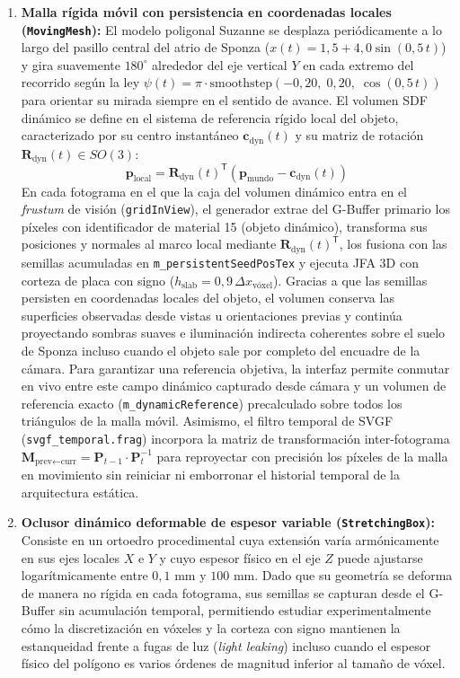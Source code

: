 \begin{enumerate}
  \item \textbf{Malla rígida móvil con persistencia en coordenadas locales (\texttt{MovingMesh}):} El modelo poligonal Suzanne se desplaza periódicamente a lo largo del pasillo central del atrio de Sponza ($x(t) = 1,5 + 4,0 \sin(0,5\,t)$) y gira suavemente $180^\circ$ alrededor del eje vertical $Y$ en cada extremo del recorrido según la ley $\psi(t) = \pi \cdot \text{smoothstep}(-0,20,\; 0,20,\; \cos(0,5\,t))$ para orientar su mirada siempre en el sentido de avance. El volumen SDF dinámico se define en el sistema de referencia rígido local del objeto, caracterizado por su centro instantáneo $\mathbf{c}_{\text{dyn}}(t)$ y su matriz de rotación $\mathbf{R}_{\text{dyn}}(t) \in SO(3)$:
  \begin{equation}
    \mathbf{p}_{\text{local}} = \mathbf{R}_{\text{dyn}}(t)^{\mathsf{T}} \left( \mathbf{p}_{\text{mundo}} - \mathbf{c}_{\text{dyn}}(t) \right)
  \end{equation}
  En cada fotograma en el que la caja del volumen dinámico entra en el \textit{frustum} de visión (\texttt{gridInView}), el generador extrae del G-Buffer primario los píxeles con identificador de material 15 (objeto dinámico), transforma sus posiciones y normales al marco local mediante $\mathbf{R}_{\text{dyn}}(t)^{\mathsf{T}}$, los fusiona con las semillas acumuladas en \texttt{m\_persistentSeedPosTex} y ejecuta JFA 3D con corteza de placa con signo ($h_{\text{slab}} = 0,9\,\Delta x_{\text{vóxel}}$). Gracias a que las semillas persisten en coordenadas locales del objeto, el volumen conserva las superficies observadas desde vistas u orientaciones previas y continúa proyectando sombras suaves e iluminación indirecta coherentes sobre el suelo de Sponza incluso cuando el objeto sale por completo del encuadre de la cámara. Para garantizar una referencia objetiva, la interfaz permite conmutar en vivo entre este campo dinámico capturado desde cámara y un volumen de referencia exacto (\texttt{m\_dynamicReference}) precalculado sobre todos los triángulos de la malla móvil. Asimismo, el filtro temporal de SVGF (\texttt{svgf\_temporal.frag}) incorpora la matriz de transformación inter-fotograma $\mathbf{M}_{\text{prev}\leftarrow\text{curr}} = \mathbf{P}_{t-1} \cdot \mathbf{P}_t^{-1}$ para reproyectar con precisión los píxeles de la malla en movimiento sin reiniciar ni emborronar el historial temporal de la arquitectura estática.
  \item \textbf{Oclusor dinámico deformable de espesor variable (\texttt{StretchingBox}):} Consiste en un ortoedro procedimental cuya extensión varía armónicamente en sus ejes locales $X$ e $Y$ y cuyo espesor físico en el eje $Z$ puede ajustarse logarítmicamente entre $0,1\text{ mm}$ y $100\text{ mm}$. Dado que su geometría se deforma de manera no rígida en cada fotograma, sus semillas se capturan desde el G-Buffer sin acumulación temporal, permitiendo estudiar experimentalmente cómo la discretización en vóxeles y la corteza con signo mantienen la estanqueidad frente a fugas de luz (\textit{light leaking}) incluso cuando el espesor físico del polígono es varios órdenes de magnitud inferior al tamaño de vóxel.
\end{enumerate}


